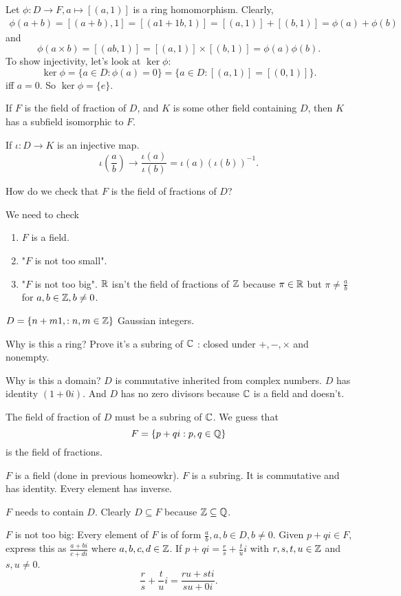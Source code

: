 \documentclass[class=article,crop=false]{standalone}
\begin{document}
Let $ \phi: D \to F, a \mapsto  [(a,1)]$ is a ring homomorphism. Clearly,
\begin{align*}
	\phi(a+b) = [(a+b),1] = [(a1+1b,1)] = [(a,1)]+[(b,1)] = \phi(a)+\phi(b)
\end{align*}
and
\[
	\phi(a\times b) = [(ab,1)] = [(a,1)]\times [(b,1)] = \phi(a)\phi(b)
.\] 
To show injectivity, let's look at $ \ker \phi$:
\[
	\ker \phi = \{a \in D: \phi(a)=0\} = \{a \in D: [(a,1)]=[(0,1)]\}  
.\] 
iff $ a=0$. So  $ \ker \phi = \{e\} $.

\begin{thm}[]
	If $ F$ is the field of fraction of  $ D$, and  $ K$ is some other field containing  $ D$, then  $ K$ has a subfield isomorphic to  $ F$.
\end{thm}

\begin{intuition}[]
If $ \iota:D \to K$ is an injective map.
\[
	\iota\left( \frac{a}{b} \right) \to \frac{\iota(a)}{\iota(b) } = \iota(a)(\iota(b))^{-1}
.\] 
\end{intuition}

How do we check that $ F$ is the field of fractions of  $ D$?

We need to check
 \begin{enumerate}[label=\arabic*)]
	 \item $ F$ is a field.
	\item "$ F$ is not too small". 
	\item "$ F$ is not too big". $ \mathbb{R}$ isn't the field of fractions of $ \mathbb{Z}$ because $ \pi \in \mathbb{R}$ but $ \pi \neq \frac{a}{b}$ for $ a,b \in \mathbb{Z}, b \neq 0$.
\end{enumerate}

\begin{eg}[21.1]
	$ D=\{n+m1,: n,m \in \mathbb{Z}\} $ Gaussian integers. 

	Why is this a ring? Prove it's a subring of $ \mathbb{C}$ : closed under $ +,-,\times $ and nonempty.

	Why is this a domain? $ D$ is commutative inherited from complex numbers.  $ D$ has identity  $ (1+0i)$. And  $ D$ has no zero divisors because  $ \mathbb{C}$ is a field and doesn't. 

	The field of fraction of $ D$ must be a subring of  $ \mathbb{C}$. We guess that
	\[
	F=\{p+qi: p,q \in \mathbb{Q}\} 
	\] 
	is the field of fractions.

	$ F$ is a field (done in previous homeowkr).  $ F$ is a subring. It is commutative and has identity. Every element has inverse.

	 $ F$ needs to contain  $ D$. Clearly  $ D \subseteq F$ because $ \mathbb{Z} \subseteq \mathbb{Q}$. 

	 $ F$ is not too big: Every element of $ F$ is of form  $ \frac{a}{b}, a,b \in D, b\neq 0$. Given  $ p+qi \in F$, express this as $ \frac{a+bi}{c+di }$ where $ a,b,c,d \in \mathbb{Z}$. If $ p+qi = \frac{r}{s} + \frac{t}{u}i$ with $ r,s,t,u \in \mathbb{Z}$ and $ s,u \neq 0$.
	  \[
	 \frac{r}{s}+ \frac{t}{u}i = \frac{ru+st i}{su+0i }
	 .\] 
\end{eg}
\end{document}
